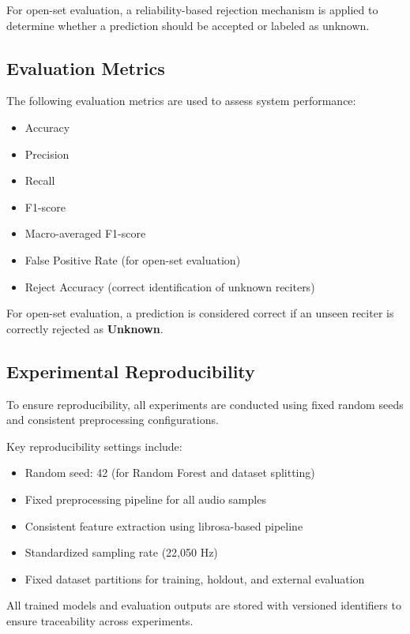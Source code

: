 \documentclass[conference]{IEEEtran}
\begin{document}
For open-set evaluation, a reliability-based rejection mechanism is applied to determine whether a prediction should be accepted or labeled as unknown.

\subsection{Evaluation Metrics}

The following evaluation metrics are used to assess system performance:

\begin{itemize}
\item Accuracy
\item Precision
\item Recall
\item F1-score
\item Macro-averaged F1-score
\item False Positive Rate (for open-set evaluation)
\item Reject Accuracy (correct identification of unknown reciters)
\end{itemize}

For open-set evaluation, a prediction is considered correct if an unseen reciter is correctly rejected as \textbf{Unknown}.

\subsection{Experimental Reproducibility}

To ensure reproducibility, all experiments are conducted using fixed random seeds and consistent preprocessing configurations.

Key reproducibility settings include:

\begin{itemize}
\item Random seed: 42 (for Random Forest and dataset splitting)
\item Fixed preprocessing pipeline for all audio samples
\item Consistent feature extraction using librosa-based pipeline
\item Standardized sampling rate (22,050 Hz)
\item Fixed dataset partitions for training, holdout, and external evaluation
\end{itemize}

All trained models and evaluation outputs are stored with versioned identifiers to ensure traceability across experiments.
\end{document}
